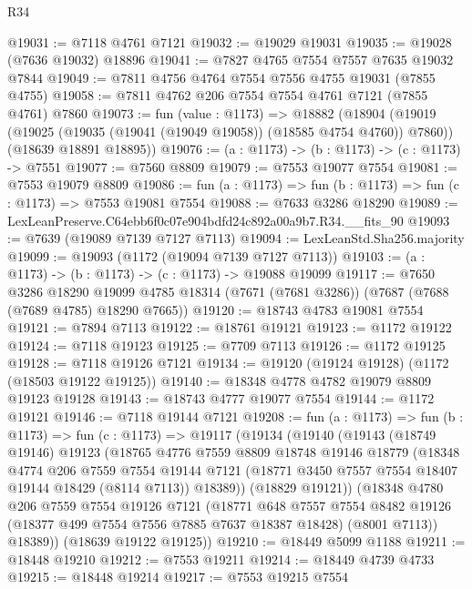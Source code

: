 \begin{lexlean}{R34}
\begin{coremodule}
@19031 := @7118 @4761 @7121
@19032 := @19029 @19031
@19035 := @19028 (@7636 @19032) @18896
@19041 := @7827 @4765 @7554 @7557 @7635 @19032 @7844
@19049 := @7811 @4756 @4764 @7554 @7556 @4755 @19031 (@7855 @4755)
@19058 := @7811 @4762 @206 @7554 @7554 @4761 @7121 (@7855 @4761) @7860
@19073 := fun (value : @1173) =>
  @18882
    (@18904
      (@19019 (@19025 (@19035 (@19041 (@19049 @19058)) (@18585 @4754 @4760)) @7860))
      (@18639 @18891 @18895))
@19076 := (a : @1173) -> (b : @1173) -> (c : @1173) -> @7551
@19077 := @7560 @8809
@19079 := @7553 @19077 @7554
@19081 := @7553 @19079 @8809
@19086 := fun (a : @1173) => fun (b : @1173) => fun (c : @1173) => @7553 @19081 @7554
@19088 := @7633 @3286 @18290
@19089 := LexLeanPreserve.C64ebb6f0c07e904bdfd24c892a00a9b7.R34.__fits_90
@19093 := @7639 (@19089 @7139 @7127 @7113)
@19094 := LexLeanStd.Sha256.majority
@19099 := @19093 (@1172 (@19094 @7139 @7127 @7113))
@19103 := (a : @1173) -> (b : @1173) -> (c : @1173) -> @19088 @19099
@19117 := @7650
    @3286
    @18290
    @19099
    @4785
    @18314
    (@7671 (@7681 @3286))
    (@7687 (@7688 (@7689 @4785) @18290 @7665))
@19120 := @18743 @4783 @19081 @7554
@19121 := @7894 @7113
@19122 := @18761 @19121
@19123 := @1172 @19122
@19124 := @7118 @19123
@19125 := @7709 @7113
@19126 := @1172 @19125
@19128 := @7118 @19126 @7121
@19134 := @19120 (@19124 @19128) (@1172 (@18503 @19122 @19125))
@19140 := @18348 @4778 @4782 @19079 @8809 @19123 @19128
@19143 := @18743 @4777 @19077 @7554
@19144 := @1172 @19121
@19146 := @7118 @19144 @7121
@19208 := fun (a : @1173) =>
  fun (b : @1173) =>
  fun (c : @1173) =>
  @19117
    (@19134
      (@19140
        (@19143
          (@18749 @19146)
          @19123
          (@18765
            @4776
            @7559
            @8809
            @18748
            @19146
            @18779
            (@18348
              @4774
              @206
              @7559
              @7554
              @19144
              @7121
              (@18771 @3450 @7557 @7554 @18407 @19144 @18429 (@8114 @7113))
              @18389))
          (@18829 @19121))
        (@18348
          @4780
          @206
          @7559
          @7554
          @19126
          @7121
          (@18771
            @648
            @7557
            @7554
            @8482
            @19126
            (@18377 @499 @7554 @7556 @7885 @7637 @18387 @18428)
            (@8001 @7113))
          @18389))
      (@18639 @19122 @19125))
@19210 := @18449 @5099 @1188
@19211 := @18448 @19210
@19212 := @7553 @19211
@19214 := @18449 @4739 @4733
@19215 := @18448 @19214
@19217 := @7553 @19215 @7554

\end{coremodule}
\end{lexlean}
